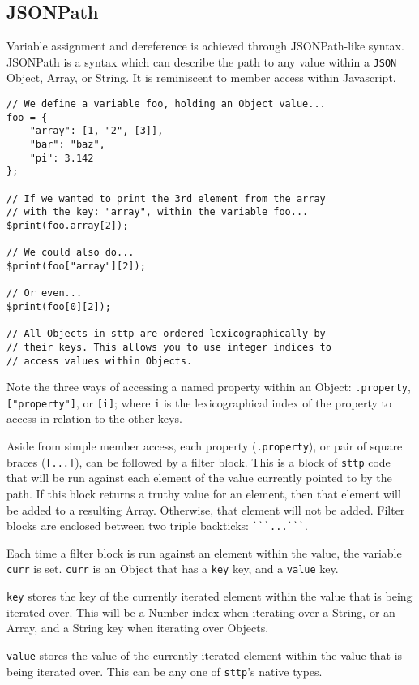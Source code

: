 \subsection{JSONPath}

Variable assignment and dereference is achieved through JSONPath-like syntax. JSONPath is a syntax which can describe the path to any value within a \verb|JSON| Object, Array, or String. It is reminiscent to member access within Javascript.

\begin{verbatim}
// We define a variable foo, holding an Object value...
foo = {
    "array": [1, "2", [3]],
    "bar": "baz",
    "pi": 3.142
};

// If we wanted to print the 3rd element from the array
// with the key: "array", within the variable foo...
$print(foo.array[2]);

// We could also do...
$print(foo["array"][2]);

// Or even...
$print(foo[0][2]);

// All Objects in sttp are ordered lexicographically by
// their keys. This allows you to use integer indices to
// access values within Objects.
\end{verbatim}

Note the three ways of accessing a named property within an Object: \verb|.property|, \verb|["property"]|, or \verb|[i]|; where \verb|i| is the lexicographical index of the property to access in relation to the other keys.

Aside from simple member access, each property (\verb|.property|), or pair of square braces (\verb|[...]|), can be followed by a filter block. This is a block of \verb|sttp| code that will be run against each element of the value currently pointed to by the path. If this block returns a truthy value for an element, then that element will be added to a resulting Array. Otherwise, that element will not be added. Filter blocks are enclosed between two triple backticks: \verb|```...```|.

Each time a filter block is run against an element within the value, the variable \verb|curr| is set. \verb|curr| is an Object that has a \verb|key| key, and a \verb|value| key.

\verb|key| stores the key of the currently iterated element within the value that is being iterated over. This will be a Number index when iterating over a String, or an Array, and a String key when iterating over Objects.

\verb|value| stores the value of the currently iterated element within the value that is being iterated over. This can be any one of \verb|sttp|'s native types.

